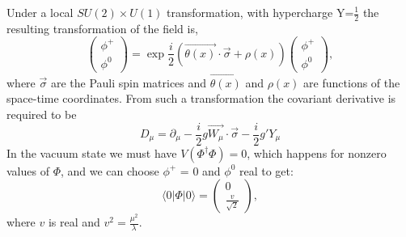 Under a local $SU(2)\times U(1)$ transformation, with hypercharge Y=$\frac{1}{2}$
the resulting transformation of the field is,
\begin{equation}\label{eqn:hfield_trsf}
\begin{pmatrix} \phi^+ \\
\phi^0 \end{pmatrix} = \exp{\frac{i}{2}(\vec{\theta(x)}\cdot\vec{\sigma} + \rho(x))}
\begin{pmatrix} \phi^+ \\
\phi^0 \end{pmatrix}, 
\end{equation}
where $\vec{\sigma}$ are the Pauli spin matrices and $\vec{\theta(x)}$ and $\rho(x)$
are functions of the space-time coordinates. From such a transformation
the covariant derivative is required to be
\begin{equation}\label{eqn:H_cov_deriv}
D_{\mu} = \partial_{\mu} - \frac{i}{2}g\vec{W_{\mu}}\cdot\vec{\sigma} - \frac{i}{2}g'Y_{\mu}
\end{equation}
In the vacuum state we must have $V(\Phi^{\dagger}\Phi) =0$, which happens for nonzero values of $\Phi$,
and we can choose $\phi^+$ = 0 and $\phi^0$ real to get:
\begin{equation}\label{eqn:field_vev}
\langle 0 | \Phi | 0 \rangle = \begin{pmatrix} 0 \\
\frac{v}{\sqrt{2}} \end{pmatrix},
\end{equation}
where $v$ is real and $v^2 = \frac{\mu^2}{\lambda}$.

